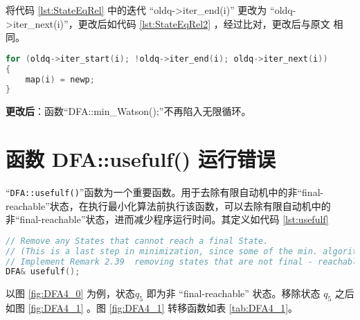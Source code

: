 将代码 \ref{lst:StateEqRel} 中的迭代 “oldq->iter\_end(i)” 更改为 “oldq->iter\_next(i)”，更改后如代码 \ref{lst:StateEqRel2} ，经过比对，更改后与原文 \cite{watson1994design} 相同。
\lstset{style=mystyle}
\begin{lstlisting}[language=C++,label={lst:StateEqRel2},caption={StateEqRel.cpp}]
for (oldq->iter_start(i); !oldq->iter_end(i); oldq->iter_next(i))
{
    map(i) = newp;
}
\end{lstlisting}

{\bfseries 更改后}：函数“DFA::min\_Watson();”不再陷入无限循环。


\section{函数 DFA::usefulf() 运行错误}

“\verb+DFA::usefulf()+”函数为一个重要函数。用于去除有限自动机中的非“final-reachable”状态，在执行最小化算法前执行该函数，可以去除有限自动机中的非“final-reachable”状态，进而减少程序运行时间。其定义如代码 \ref{lst:usefulf}
\lstset{style=mystyle}
\begin{lstlisting}[language=C++,label={lst:usefulf},caption={DFA::usefulf()}]
// Remove any States that cannot reach a final State.
// (This is a last step in minimization, since some of the min. algorithms may yield a DFA with a sink state.)
// Implement Remark 2.39  removing states that are not final - reachable.
DFA& usefulf();
\end{lstlisting}
以图 \ref{fig:DFA4_0} 为例，状态$q_5$ 即为非 “final-reachable” 状态。移除状态 $q_5$ 之后如图 \ref{fig:DFA4_1} 。图 \ref{fig:DFA4_1} 转移函数如表 \ref{tab:DFA4_1}。

